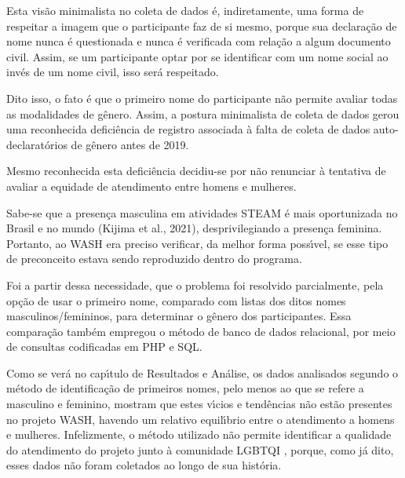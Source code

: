 \documentclass[
12pt,		%
openright,	%
twoside,  %
a4paper,			%
chapter=TITLE,		%
english,			%
french,				%
spanish,			%
brazil				%
]{USPSC-classe/USPSC_RedarTex}
\begin{document}
Esta vis\~ao minimalista no coleta de dados \'e, indiretamente, uma forma de respeitar a imagem que o participante faz de si mesmo, porque sua declara\c{c}\~ao de nome nunca \'e questionada e nunca \'e verificada com rela\c{c}\~ao a algum documento civil. Assim, se um participante optar por se identificar com um nome social ao inv\'es de um nome civil, isso ser\'a respeitado.








Dito isso, o fato \'e que o primeiro nome do participante n\~ao permite avaliar todas as modalidades de g\^enero. Assim, a postura minimalista de coleta de dados gerou uma reconhecida defici\^encia de registro associada \`a falta de coleta de dados auto-declarat\'orios de g\^enero antes de 2019.








Mesmo reconhecida esta defici\^encia decidiu-se por n\~ao renunciar \`a tentativa de avaliar a equidade de atendimento entre homens e mulheres.








Sabe-se que a presen\c{c}a masculina em atividades STEAM \'e mais oportunizada no Brasil e no mundo (Kijima et al., 2021), desprivilegiando a presen\c{c}a feminina. Portanto, ao WASH era preciso verificar, da melhor forma poss\'{\i}vel, se esse tipo de preconceito estava sendo reproduzido dentro do programa.








Foi a partir dessa necessidade, que o problema foi resolvido parcialmente, pela op\c{c}\~ao de usar o primeiro nome, comparado com listas dos ditos nomes masculinos/femininos, para determinar o g\^enero dos participantes. Essa compara\c{c}\~ao tamb\'em empregou o m\'etodo de banco de dados relacional, por meio de consultas codificadas em PHP e SQL.








Como se ver\'a no cap\'{\i}tulo de Resultados e An\'alise, os dados analisados segundo o m\'etodo de identifica\c{c}\~ao de primeiros nomes, pelo menos ao que se refere a masculino e feminino, mostram que estes v\'{\i}cios e tend\^encias n\~ao est\~ao presentes no projeto WASH, havendo um relativo equil\'{\i}brio entre o atendimento a homens e mulheres. Infelizmente, o m\'etodo utilizado n\~ao permite identificar a qualidade do atendimento do projeto junto \`a comunidade LGBTQI , porque, como j\'a dito, esses dados n\~ao foram coletados ao longo de sua hist\'oria.
\end{document}

